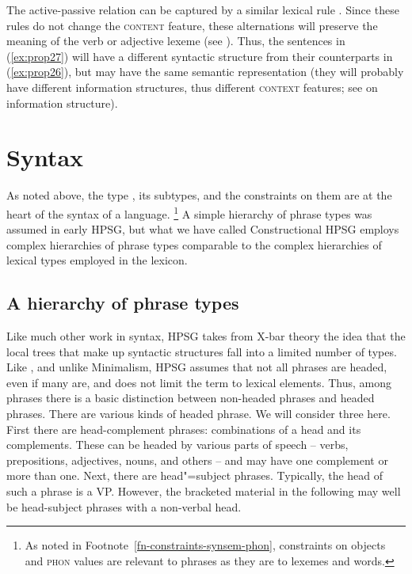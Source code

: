 \documentclass[output=paper
	        ,collection
	        ,collectionchapter
 	        ,biblatex
                ,babelshorthands
                ,newtxmath
                ,draftmode
                ,colorlinks, citecolor=brown
]{langscibook}
\begin{document}
\ea\label{ex:prop28}
\avm{[arg-st & < S > \+ \2] $\mapsto$
	[arg-st & < NP![\type{it}]! > \+ \2 \+ < S >]}
\z

\noindent
The active-passive relation can be captured by a similar lexical rule
\citep[Section~5.1.1]{Flickinger87}. Since these rules do not change the \textsc{content} feature,
these alternations will preserve the meaning of the verb or adjective lexeme (see
). Thus, the sentences in (\ref{ex:prop27}) will have a different
syntactic structure from their counterparts in (\ref{ex:prop26}), but may have the same semantic
representation (they will probably have different information structures, thus different
\textsc{context} features; see  on information structure).


\section{Syntax}\label{sec:prop5}
\label{prop:sec-syntax}

As noted above, the type , its subtypes, and the constraints on them are at the heart of the syntax of a language.%
%
\footnote{As noted in Footnote~\ref{fn-constraints-synsem-phon}, constraints on  objects and \textsc{phon} values are relevant to phrases as they are to lexemes and words.}
%
A simple hierarchy of phrase types was assumed in early HPSG, but what we have called Constructional HPSG employs complex hierarchies of phrase types comparable to the complex hierarchies of lexical types employed in the lexicon.

\subsection{A hierarchy of phrase types}\label{sec:prop5.1}

Like much other work in syntax, HPSG takes from X-bar theory \citep{Jackendoff77a} the idea that the local trees that make up syntactic structures fall into a limited number of types. Like \citet{Jackendoff77a}, and unlike Minimalism\indexmp, HPSG assumes that not all phrases are headed, even if many are, and does not limit the term  to lexical elements. Thus, among phrases there is a basic distinction between non-headed phrases and headed phrases. There are various kinds of headed phrase. We will consider three here. First there are head-complement phrases: combinations of a head and its complements. These can be headed by various parts of speech -- verbs, prepositions, adjectives, nouns, and others -- and may have one complement or more than one. Next, there are head"=subject phrases. Typically, the head of such a phrase is a VP. However, the bracketed material in the following may well be head-subject phrases with a non-verbal head. 
\end{document}

